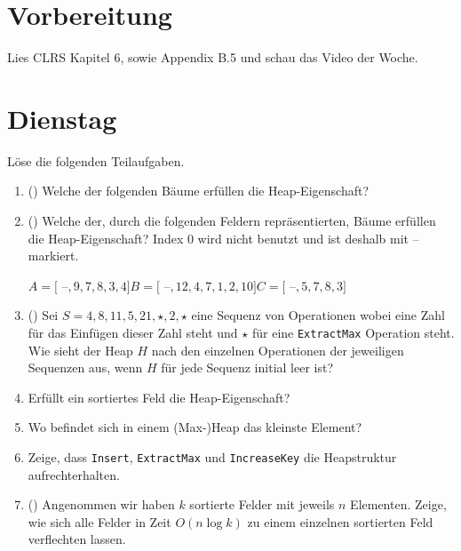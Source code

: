 \documentclass{uebung_cs}
\begin{document}
\section*{Vorbereitung}
Lies CLRS Kapitel 6, sowie Appendix B.5 und schau das Video der Woche.

\section*{Dienstag}
\begin{aufgabe}\label{tue-first}
	Löse die folgenden Teilaufgaben.
	\begin{enumerate}
		\item (\warmup) Welche der folgenden Bäume erfüllen die Heap-Eigenschaft?
		\item (\warmup) Welche der, durch die folgenden Feldern repräsentierten, Bäume erfüllen die Heap-Eigenschaft?
		Index 0 wird nicht benutzt und ist deshalb mit -- markiert.
		\begin{center}
			$A = [$ --$,9,7,8,3,4]$\hspace*{10pt}$B = [$ --$,12,4,7,1,2,10]$\hspace*{10pt}$C = [$ --$,5,7,8,3]$
		\end{center}
		\item (\warmup) Sei $S = 4,8,11,5,21,\star,2,\star$ eine Sequenz von Operationen wobei eine Zahl für das Einfügen dieser Zahl steht und $\star$ für eine \texttt{ExtractMax} Operation steht.
		Wie sieht der Heap $H$ nach den einzelnen Operationen der jeweiligen Sequenzen aus, wenn $H$ für jede Sequenz initial leer ist?
		\item Erfüllt ein sortiertes Feld die Heap-Eigenschaft?
		\item Wo befindet sich in einem (Max-)Heap das kleinste Element?
		\item Zeige, dass \texttt{Insert}, \texttt{ExtractMax} und \texttt{IncreaseKey} die Heapstruktur aufrechterhalten.
		\item (\hard) Angenommen wir haben $k$ sortierte Felder mit jeweils $n$ Elementen.
		Zeige, wie sich alle Felder in Zeit $O(n\log k)$ zu einem einzelnen sortierten Feld verflechten lassen.
	\end{enumerate}
\end{aufgabe}
\end{document}
